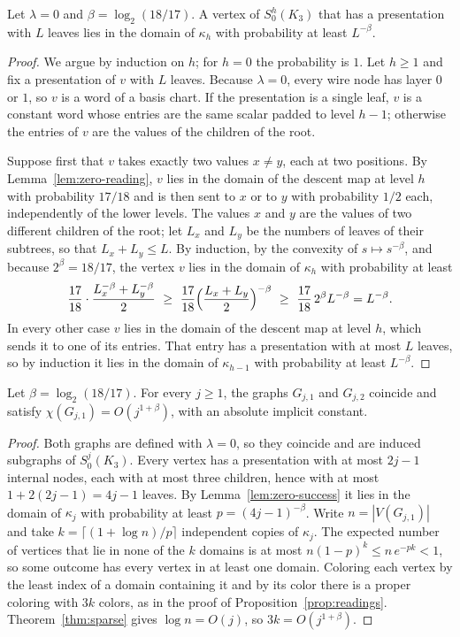 \begin{lemma}\label{lem:zero-success}
Let $\lambda=0$ and $\beta=\log_2(18/17)$. A vertex of $S^h_0(K_3)$ that has a presentation with $L$ leaves lies in the domain of $\kappa_h$ with probability at least $L^{-\beta}$.
\end{lemma}
\begin{proof}
We argue by induction on $h$; for $h=0$ the probability is $1$. Let $h\ge1$ and fix a presentation of $v$ with $L$ leaves. Because $\lambda=0$, every wire node has layer $0$ or $1$, so $v$ is a word of a basis chart. If the presentation is a single leaf, $v$ is a constant word whose entries are the same scalar padded to level $h-1$; otherwise the entries of $v$ are the values of the children of the root.

Suppose first that $v$ takes exactly two values $x\ne y$, each at two positions. By Lemma~\ref{lem:zero-reading}, $v$ lies in the domain of the descent map at level $h$ with probability $17/18$ and is then sent to $x$ or to $y$ with probability $1/2$ each, independently of the lower levels. The values $x$ and $y$ are the values of two different children of the root; let $L_x$ and $L_y$ be the numbers of leaves of their subtrees, so that $L_x+L_y\le L$. By induction, by the convexity of $s\mapsto s^{-\beta}$, and because $2^\beta=18/17$, the vertex $v$ lies in the domain of $\kappa_h$ with probability at least
\[
 \frac{17}{18}\cdot\frac{L_x^{-\beta}+L_y^{-\beta}}{2}
 \ \ge\ \frac{17}{18}\Bigl(\frac{L_x+L_y}{2}\Bigr)^{-\beta}
 \ \ge\ \frac{17}{18}\,2^\beta L^{-\beta}=L^{-\beta}.
\]
In every other case $v$ lies in the domain of the descent map at level $h$, which sends it to one of its entries. That entry has a presentation with at most $L$ leaves, so by induction it lies in the domain of $\kappa_{h-1}$ with probability at least $L^{-\beta}$.
\end{proof}

\begin{proposition}\label{prop:zero-layer}
Let $\beta=\log_2(18/17)$. For every $j\ge1$, the graphs $G_{j,1}$ and $G_{j,2}$ coincide and satisfy $\chi(G_{j,1})=O(j^{1+\beta})$, with an absolute implicit constant.
\end{proposition}
\begin{proof}
Both graphs are defined with $\lambda=0$, so they coincide and are induced subgraphs of $S^j_0(K_3)$. Every vertex has a presentation with at most $2j-1$ internal nodes, each with at most three children, hence with at most $1+2(2j-1)=4j-1$ leaves. By Lemma~\ref{lem:zero-success} it lies in the domain of $\kappa_j$ with probability at least $p=(4j-1)^{-\beta}$. Write $n=|V(G_{j,1})|$ and take $k=\lceil(1+\log n)/p\rceil$ independent copies of $\kappa_j$. The expected number of vertices that lie in none of the $k$ domains is at most $n(1-p)^k\le n\,e^{-pk}<1$, so some outcome has every vertex in at least one domain. Coloring each vertex by the least index of a domain containing it and by its color there is a proper coloring with $3k$ colors, as in the proof of Proposition~\ref{prop:readings}. Theorem~\ref{thm:sparse} gives $\log n=O(j)$, so $3k=O(j^{1+\beta})$.
\end{proof}
